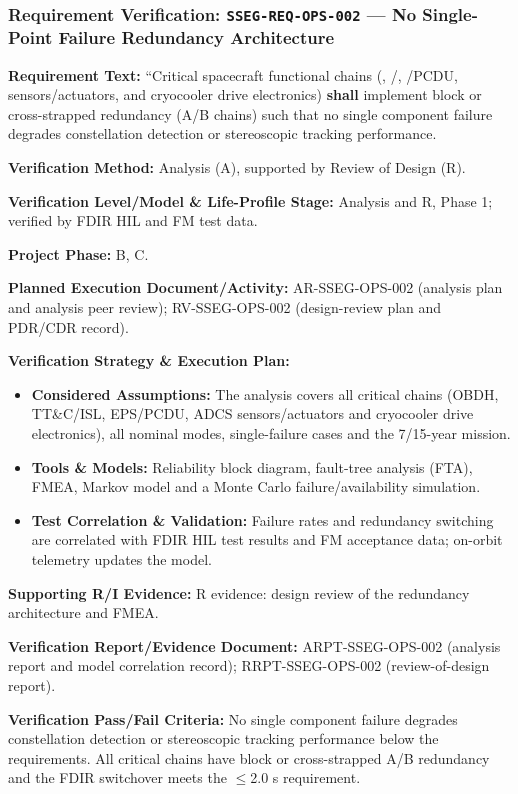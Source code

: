 \subsubsection{Requirement Verification: \texttt{SSEG-REQ-OPS-002} --- No Single-Point Failure Redundancy Architecture}
\label{ver:SSEG-REQ-OPS-002}
\textbf{Requirement Text:} ``Critical spacecraft functional chains (, /, /PCDU,  sensors/actuators, and cryocooler drive electronics) \textbf{shall} implement block or cross-strapped redundancy (A/B chains) such that no single component failure degrades constellation detection or stereoscopic tracking performance.
\par\textbf{Verification Method:} Analysis (A), supported by Review of Design (R).
\par\textbf{Verification Level/Model \& Life-Profile Stage:} Analysis and R, Phase 1; verified by FDIR HIL and FM test data.
\par\textbf{Project Phase:} B, C.
\par\textbf{Planned Execution Document/Activity:} AR-SSEG-OPS-002 (analysis plan and analysis peer review); RV-SSEG-OPS-002 (design-review plan and PDR/CDR record).
\par\textbf{Verification Strategy \& Execution Plan:}
\begin{itemize}
\item \textbf{Considered Assumptions:} The analysis covers all critical chains (OBDH, TT\&C/ISL, EPS/PCDU, ADCS sensors/actuators and cryocooler drive electronics), all nominal modes, single-failure cases and the 7/15-year mission.
\item \textbf{Tools \& Models:} Reliability block diagram, fault-tree analysis (FTA), FMEA, Markov model and a Monte Carlo failure/availability simulation.
\item \textbf{Test Correlation \& Validation:} Failure rates and redundancy switching are correlated with FDIR HIL test results and FM acceptance data; on-orbit telemetry updates the model.
\end{itemize}
\par\textbf{Supporting R/I Evidence:} R evidence: design review of the redundancy architecture and FMEA.
\par\textbf{Verification Report/Evidence Document:} ARPT-SSEG-OPS-002 (analysis report and model correlation record); RRPT-SSEG-OPS-002 (review-of-design report).
\par\textbf{Verification Pass/Fail Criteria:} No single component failure degrades constellation detection or stereoscopic tracking performance below the requirements. All critical chains have block or cross-strapped A/B redundancy and the FDIR switchover meets the $\le$2.0 s requirement.
\par\medskip
